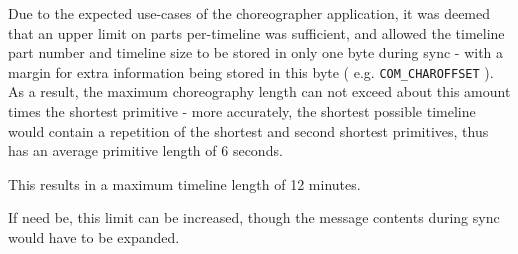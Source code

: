 Due to the expected use-cases of the choreographer application, it was deemed that an upper limit on parts per-timeline was sufficient, and allowed the timeline part number and timeline size to be stored in only one byte during sync - with a margin for extra information being stored in this byte ( e.g. \texttt{COM\_CHAROFFSET} ). As a result, the maximum choreography length can not exceed about this amount times the shortest primitive - more accurately, the shortest possible timeline would contain a repetition of the shortest and second shortest primitives, thus has an average primitive length of 6 seconds. 

This results in a maximum timeline length of 12 minutes. 

If need be, this limit can be increased, though the message contents during sync would have to be expanded.